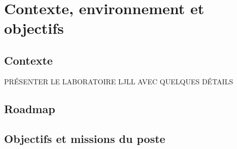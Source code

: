
\chapter{Contexte, environnement et objectifs} %

\label{Chapter2} %



\section{Contexte}

PRÉSENTER LE LABORATOIRE LJLL AVEC QUELQUES DÉTAILS












\section{Roadmap}












\section{Objectifs et missions du poste}















